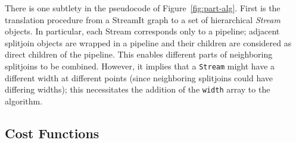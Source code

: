There is one subtlety in the pseudocode of Figure~\ref{fig:part-alg}.
First is the translation procedure from a StreamIt graph to a set of
hierarchical {\it Stream} objects.  In particular, each Stream
corresponds only to a pipeline; adjacent splitjoin objects are wrapped
in a pipeline and their children are considered as direct children of
the pipeline. This enables different parts of neighboring splitjoins
to be combined.  However, it implies that a {\tt Stream} might have a
different width at different points (since neighboring splitjoins
could have differing widths); this necessitates the addition of the
{\tt width} array to the algorithm.

\subsection{Cost Functions}
\label{sec:cost}

